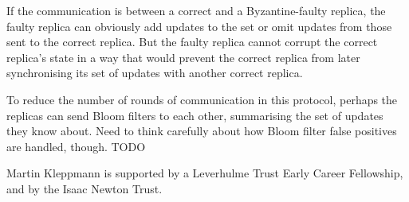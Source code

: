\documentclass[manuscript]{acmart}
\begin{document}
If the communication is between a correct and a Byzantine-faulty replica, the faulty replica can obviously add updates to the set or omit updates from those sent to the correct replica.
But the faulty replica cannot corrupt the correct replica's state in a way that would prevent the correct replica from later synchronising its set of updates with another correct replica.

To reduce the number of rounds of communication in this protocol, perhaps the replicas can send Bloom filters to each other, summarising the set of updates they know about.
Need to think carefully about how Bloom filter false positives are handled, though. TODO

\begin{acks}
Martin Kleppmann is supported by a Leverhulme Trust Early Career Fellowship, and by the Isaac Newton Trust.
\end{acks}



\end{document}
